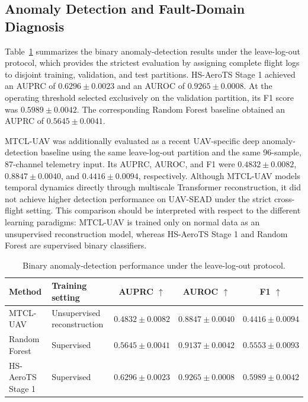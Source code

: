 \subsection{Anomaly Detection and Fault-Domain Diagnosis}
\label{sec:real_telemetry_results}

Table~\ref{tab:binary_llo_performance} summarizes the binary anomaly-detection results under the leave-log-out protocol, which provides the strictest evaluation by assigning complete flight logs to disjoint training, validation, and test partitions. HS-AeroTS Stage 1 achieved an AUPRC of $0.6296\pm0.0023$ and an AUROC of $0.9265\pm0.0008$. At the operating threshold selected exclusively on the validation partition, its F1 score was $0.5989\pm0.0042$. The corresponding Random Forest baseline obtained an AUPRC of $0.5645\pm0.0041$.

MTCL-UAV was additionally evaluated as a recent UAV-specific deep anomaly-detection baseline using the same leave-log-out partition and the same 96-sample, 87-channel telemetry input. Its AUPRC, AUROC, and F1 were $0.4832\pm0.0082$, $0.8847\pm0.0040$, and $0.4416\pm0.0094$, respectively. Although MTCL-UAV models temporal dynamics directly through multiscale Transformer reconstruction, it did not achieve higher detection performance on UAV-SEAD under the strict cross-flight setting. This comparison should be interpreted with respect to the different learning paradigms: MTCL-UAV is trained only on normal data as an unsupervised reconstruction model, whereas HS-AeroTS Stage 1 and Random Forest are supervised binary classifiers.

\begin{table}[H]
\caption{Binary anomaly-detection performance under the leave-log-out protocol.}
\label{tab:binary_llo_performance}
\centering
\footnotesize
\renewcommand{\arraystretch}{1.12}
\begin{tabularx}{\textwidth}{@{}>{\RaggedRight\arraybackslash}p{2.55cm} >{\RaggedRight\arraybackslash}X ccc@{}}
\toprule
\textbf{Method} & \textbf{Training setting} & \textbf{AUPRC $\uparrow$} & \textbf{AUROC $\uparrow$} & \textbf{F1 $\uparrow$}\\
\midrule
MTCL-UAV & Unsupervised reconstruction & $0.4832\pm0.0082$ & $0.8847\pm0.0040$ & $0.4416\pm0.0094$\\
Random Forest & Supervised & $0.5645\pm0.0041$ & $0.9137\pm0.0042$ & $0.5553\pm0.0093$\\
HS-AeroTS Stage 1 & Supervised & $\mathbf{0.6296\pm0.0023}$ & $\mathbf{0.9265\pm0.0008}$ & $\mathbf{0.5989\pm0.0042}$\\
\bottomrule
\end{tabularx}
\par\vspace{2pt}{\scriptsize Values are mean $\pm$ standard deviation over five random seeds. Threshold-dependent metrics use operating points selected on the validation partition. MTCL-UAV follows a normal-only reconstruction setting and is therefore not directly equivalent to the supervised classifiers in training supervision.}
\end{table}

